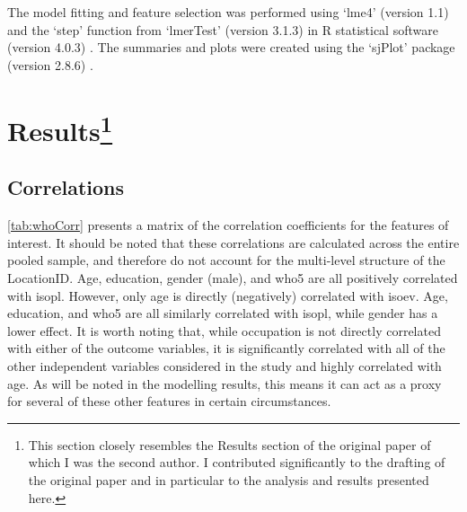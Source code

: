 The model fitting and feature selection was performed using `lme4' (version 1.1) and the `step' function from `lmerTest' (version 3.1.3) \citep{Kuznetsova2017lmerTest} in R statistical software (version 4.0.3) \citep{RCT2018R}. The summaries and plots were created using the `sjPlot' package (version 2.8.6) \citep{Luedecke2021sjPlot}.

\section[Results]{Results\footnote{This section closely resembles the Results section of the original paper \citep{Erfanian2021Psychological} of which I was the second author. I contributed significantly to the drafting of the original paper and in particular to the analysis and results presented here.}}

\subsection{Correlations}

\cref{tab:whoCorr} presents a matrix of the correlation coefficients for the features of interest. It should be noted that these correlations are calculated across the entire pooled sample, and therefore do not account for the multi-level structure of the LocationID. Age, education, gender (male), and \gls{who5} are all positively correlated with \gls{isopl}. However, only age is directly (negatively) correlated with \gls{isoev}. Age, education, and \gls{who5} are all similarly correlated with \gls{isopl}, while gender has a lower effect. It is worth noting that, while occupation is not directly correlated with either of the outcome variables, it is significantly correlated with all of the other independent variables considered in the study and highly correlated with age. As will be noted in the modelling results, this means it can act as a proxy for several of these other features in certain circumstances.

